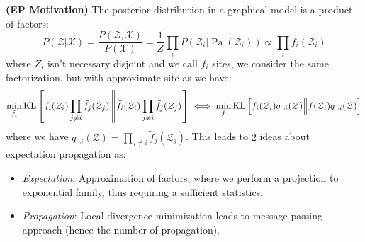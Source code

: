 \begin{remark}{\textbf{(EP Motivation)}}
    The posterior distribution in a graphical model is a product of factors:
    \begin{equation*}
        P(\mathcal{Z}|\mathcal{X}) = \frac{P(\mathcal{Z}, \mathcal{X})}{P(\mathcal{X})} = \frac{1}{Z}\prod_i P(\mathcal{Z}_i | \operatorname{Pa}(\mathcal{Z}_i)) \propto \prod_i f_i(\mathcal{Z}_i)
    \end{equation*}
    where $Z_i$ isn't necessary disjoint and we call $f_i$ sites, we consider the same factorization, but with approximate site as we have:
    \begin{equation*}
        \min_{\tilde{f}_i}\operatorname{KL}\left[  f_i(\mathcal{Z}_i) \prod_{j\ne i}\tilde{f}_j(\mathcal{Z}_j) \left\| \tilde{f}_i(\mathcal{Z}_i) \prod_{j\ne i}\tilde{f}_j(\mathcal{Z}_j) \right. \right] \iff \min_{f} \operatorname{KL}\left[  f_i(\mathcal{Z}_i) q_{\neg i}(\mathcal{Z}) \Big\| f(\mathcal{Z}_i)q_{\neg i}(\mathcal{Z})  \right]
    \end{equation*}
    where we have $q_{\neg i}(\mathcal{Z}) = \prod_{j\ne i}\tilde{f}_j(\mathcal{Z}_j)$. This leads to $2$ ideas about expectation propagation as:
    \begin{itemize}
        \item \emph{Expectation}: Approximation of factors, where we perform a projection to exponential family, thus requiring a sufficient statistics. 
        \item \emph{Propagation}: Local divergence minimization leads to message passing approach (hence the number of propagation).
    \end{itemize}
\end{remark}

